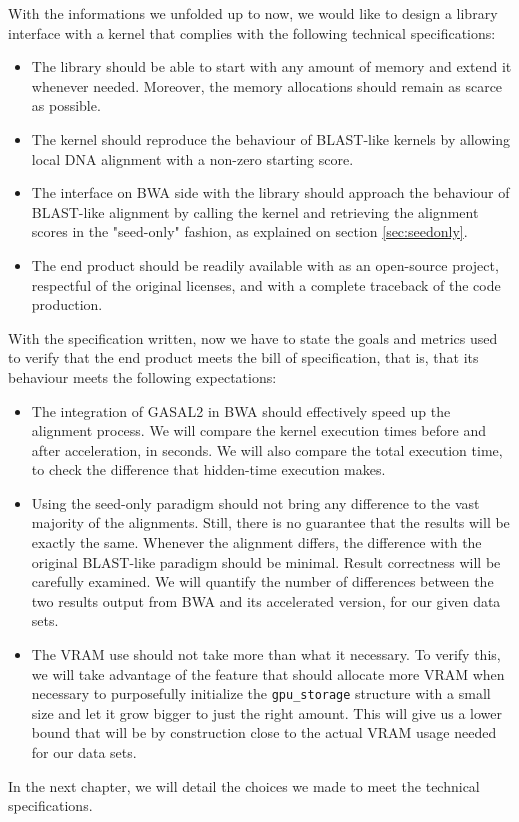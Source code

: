 With the informations we unfolded up to now, we would like to design a library interface with a kernel that complies with the following technical specifications:

\begin{itemize}
	\item The library should be able to start with any amount of memory and extend it whenever needed. Moreover, the memory allocations should remain as scarce as possible.
	\item The kernel should reproduce the behaviour of BLAST-like kernels by allowing local DNA alignment with a non-zero starting score.
	\item The interface on BWA side with the library should approach the behaviour of BLAST-like alignment by calling the kernel and retrieving the alignment scores in the "seed-only" fashion, as explained on section \ref{sec:seedonly}.
	\item The end product should be readily available with as an open-source project, respectful of the original licenses, and with a complete traceback of the code production.
\end{itemize}

With the specification written, now we have to state the goals and metrics used to verify that the end product meets the bill of specification, that is, that its behaviour meets the following expectations: 

\begin{itemize}
	\item The integration of GASAL2 in BWA should effectively speed up the alignment process. We will compare the kernel execution times before and after acceleration, in seconds. We will also compare the total execution time, to check the difference that hidden-time execution makes.
	
	\item Using the seed-only paradigm should not bring any difference to the vast majority of the alignments. Still, there is no guarantee that the results will be exactly the same. Whenever the alignment differs, the difference with the original BLAST-like paradigm should be minimal. Result correctness will be carefully examined. We will quantify the number of differences between the two results output from BWA and its accelerated version, for our given data sets.
	
	\item The VRAM use should not take more than what it necessary. To verify this, we will take advantage of the feature that should allocate more VRAM when necessary to purposefully initialize the \verb|gpu_storage| structure with a small size and let it grow bigger to just the right amount. This will give us a lower bound that will be by construction close to the actual VRAM usage needed for our data sets.
	
\end{itemize}

In the next chapter, we will detail the choices we made to meet the technical specifications.